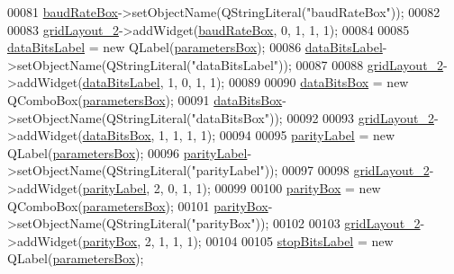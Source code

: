 \begin{DoxyCode}
00081         \hyperlink{a00082_a766a61db4a8c72219543f7c096ae5601}{baudRateBox}->setObjectName(QStringLiteral(\textcolor{stringliteral}{"baudRateBox"}));
00082 
00083         \hyperlink{a00082_a7b71d6038a34f600625f007630c5234e}{gridLayout\_2}->addWidget(\hyperlink{a00082_a766a61db4a8c72219543f7c096ae5601}{baudRateBox}, 0, 1, 1, 1);
00084 
00085         \hyperlink{a00082_a4d827d5f217aa166e228b0e2c9c5aaf7}{dataBitsLabel} = \textcolor{keyword}{new} QLabel(\hyperlink{a00082_a47cebbe70a990bd1f309250101022889}{parametersBox});
00086         \hyperlink{a00082_a4d827d5f217aa166e228b0e2c9c5aaf7}{dataBitsLabel}->setObjectName(QStringLiteral(\textcolor{stringliteral}{"dataBitsLabel"}));
00087 
00088         \hyperlink{a00082_a7b71d6038a34f600625f007630c5234e}{gridLayout\_2}->addWidget(\hyperlink{a00082_a4d827d5f217aa166e228b0e2c9c5aaf7}{dataBitsLabel}, 1, 0, 1, 1);
00089 
00090         \hyperlink{a00082_ab6082bb196e22af4ca04a04db3402166}{dataBitsBox} = \textcolor{keyword}{new} QComboBox(\hyperlink{a00082_a47cebbe70a990bd1f309250101022889}{parametersBox});
00091         \hyperlink{a00082_ab6082bb196e22af4ca04a04db3402166}{dataBitsBox}->setObjectName(QStringLiteral(\textcolor{stringliteral}{"dataBitsBox"}));
00092 
00093         \hyperlink{a00082_a7b71d6038a34f600625f007630c5234e}{gridLayout\_2}->addWidget(\hyperlink{a00082_ab6082bb196e22af4ca04a04db3402166}{dataBitsBox}, 1, 1, 1, 1);
00094 
00095         \hyperlink{a00082_ae062846ca8db471d7eb362ae39123422}{parityLabel} = \textcolor{keyword}{new} QLabel(\hyperlink{a00082_a47cebbe70a990bd1f309250101022889}{parametersBox});
00096         \hyperlink{a00082_ae062846ca8db471d7eb362ae39123422}{parityLabel}->setObjectName(QStringLiteral(\textcolor{stringliteral}{"parityLabel"}));
00097 
00098         \hyperlink{a00082_a7b71d6038a34f600625f007630c5234e}{gridLayout\_2}->addWidget(\hyperlink{a00082_ae062846ca8db471d7eb362ae39123422}{parityLabel}, 2, 0, 1, 1);
00099 
00100         \hyperlink{a00082_a88c0b5d1f96a308ab115937b090f7bba}{parityBox} = \textcolor{keyword}{new} QComboBox(\hyperlink{a00082_a47cebbe70a990bd1f309250101022889}{parametersBox});
00101         \hyperlink{a00082_a88c0b5d1f96a308ab115937b090f7bba}{parityBox}->setObjectName(QStringLiteral(\textcolor{stringliteral}{"parityBox"}));
00102 
00103         \hyperlink{a00082_a7b71d6038a34f600625f007630c5234e}{gridLayout\_2}->addWidget(\hyperlink{a00082_a88c0b5d1f96a308ab115937b090f7bba}{parityBox}, 2, 1, 1, 1);
00104 
00105         \hyperlink{a00082_a665748b39dda24475690e2363b72e265}{stopBitsLabel} = \textcolor{keyword}{new} QLabel(\hyperlink{a00082_a47cebbe70a990bd1f309250101022889}{parametersBox});

\end{DoxyCode}
